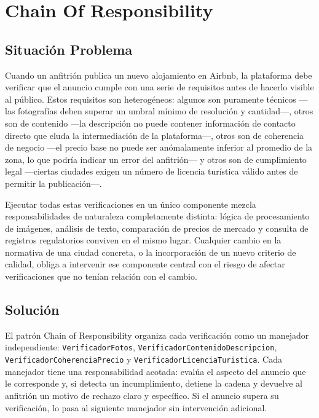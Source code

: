 
\chapter{Chain Of Responsibility}

\section{Situación Problema}

Cuando un anfitrión publica un nuevo alojamiento en Airbnb, la plataforma
debe verificar que el anuncio cumple con una serie de requisitos antes
de hacerlo visible al público. Estos requisitos son heterogéneos: algunos
son puramente técnicos ---las fotografías deben superar un umbral mínimo
de resolución y cantidad---, otros son de contenido ---la descripción
no puede contener información de contacto directo que eluda la
intermediación de la plataforma---, otros son de coherencia de negocio
---el precio base no puede ser anómalamente inferior al promedio de la
zona, lo que podría indicar un error del anfitrión--- y otros son de
cumplimiento legal ---ciertas ciudades exigen un número de licencia
turística válido antes de permitir la publicación---.

Ejecutar todas estas verificaciones en un único componente mezcla
responsabilidades de naturaleza completamente distinta: lógica de
procesamiento de imágenes, análisis de texto, comparación de precios
de mercado y consulta de registros regulatorios conviven en el mismo
lugar. Cualquier cambio en la normativa de una ciudad concreta, o la
incorporación de un nuevo criterio de calidad, obliga a intervenir ese
componente central con el riesgo de afectar verificaciones que no tenían
relación con el cambio.

\section{Solución}

El patrón Chain of Responsibility organiza cada verificación como un
manejador independiente: \texttt{VerificadorFotos},
\texttt{VerificadorContenidoDescripcion}, \texttt{VerificadorCoherenciaPrecio}
y \texttt{VerificadorLicenciaTuristica}. Cada manejador tiene una
responsabilidad acotada: evalúa el aspecto del anuncio que le corresponde
y, si detecta un incumplimiento, detiene la cadena y devuelve al
anfitrión un motivo de rechazo claro y específico. Si el anuncio supera
su verificación, lo pasa al siguiente manejador sin intervención adicional.

